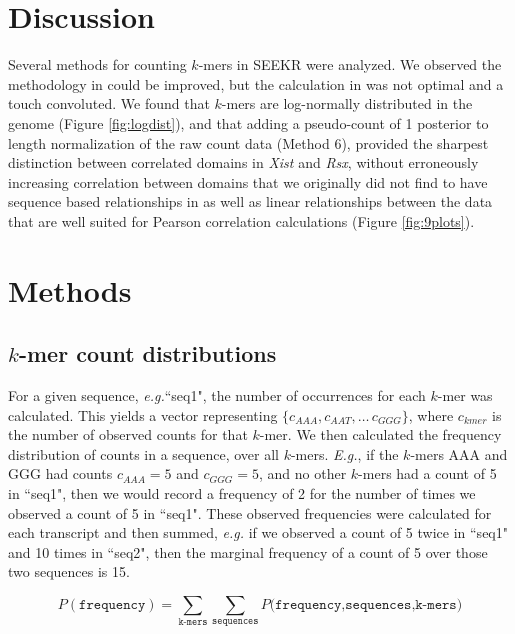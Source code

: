 \clearpage

\section{Discussion}

Several methods for counting $k$-mers in SEEKR were analyzed. We observed the methodology in \cite{Kirk2018FunctionalContent} could be improved, but the calculation in \cite{Sprague2019NonlinearDomains} was not optimal and a touch convoluted. We found that $k$-mers are log-normally distributed in the genome (Figure \ref{fig:logdist}), and that adding a pseudo-count of 1 posterior to length normalization of the raw count data (Method 6), provided the sharpest distinction between correlated domains in \textit{Xist} and \textit{Rsx}, without erroneously increasing correlation between domains that we originally did not find to have sequence based relationships in \cite{Sprague2019NonlinearDomains} as well as linear relationships between the data that are well suited for Pearson correlation calculations (Figure \ref{fig:9plots}). 

\section{Methods}

\subsection{$k$-mer count distributions}

For a given sequence, \emph{e.g.}``seq1", the number of occurrences for each $k$-mer was calculated. This yields a vector representing $\{c_{AAA},c_{AAT},\dots\,c_{GGG}\}$, where $c_{kmer}$ is the number of observed counts for that $k$-mer. We then calculated the frequency distribution of counts in a sequence, over all $k$-mers. \emph{E.g.}, if the $k$-mers AAA and GGG had counts $c_{AAA} = 5$ and $c_{GGG} = 5$, and no other $k$-mers had a count of 5 in ``seq1", then we would record a frequency of 2 for the number of times we observed a count of 5 in ``seq1". These observed frequencies were calculated for each transcript and then summed, \emph{e.g.} if we observed a count of 5 twice in ``seq1" and 10 times in ``seq2", then the marginal frequency of a count of 5 over those two sequences is 15.

$$
P(\texttt{frequency}) = \sum_{\texttt{k-mers}}{\sum_{\texttt{sequences}}{P(\texttt{frequency,sequences,k-mers)}}}
$$


